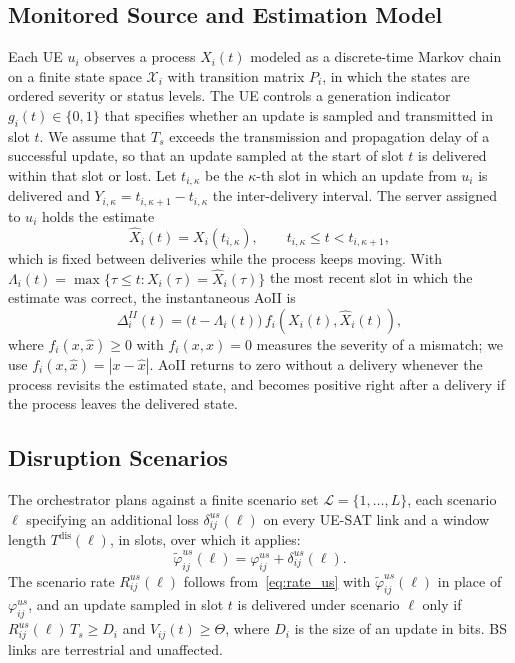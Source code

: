 \subsection{Monitored Source and Estimation Model}

Each UE $u_i$ observes a process $X_i(t)$ modeled as a discrete-time Markov chain on a finite state space
$\mathcal{X}_i$ with transition matrix $P_i$, in which the states are ordered severity or status levels. The UE
controls a generation indicator $g_i(t)\in\{0,1\}$ that specifies whether an update is sampled and transmitted in
slot $t$. We assume that $T_s$ exceeds the transmission and propagation delay of a successful update, so that an update
sampled at the start of slot $t$ is delivered within that slot or lost. Let $t_{i,\kappa}$ be the $\kappa$-th slot in
which an update from $u_i$ is delivered and $Y_{i,\kappa}=t_{i,\kappa+1}-t_{i,\kappa}$ the inter-delivery interval.
The server assigned to $u_i$ holds the estimate
\begin{equation}
    \hat{X}_i(t)=X_i(t_{i,\kappa}),\qquad t_{i,\kappa}\leq t<t_{i,\kappa+1},
\end{equation}
which is fixed between deliveries while the process keeps moving. With $\Lambda_i(t)=\max\{\tau\leq t:
X_i(\tau)=\hat{X}_i(\tau)\}$ the most recent slot in which the estimate was correct, the instantaneous AoII
is~\cite{Maatouk2020}
\begin{equation}
    \Delta_i^{II}(t)=\bigl(t-\Lambda_i(t)\bigr)\,f_i\!\left(X_i(t),\hat{X}_i(t)\right),
    \label{eq:aoii_def}
\end{equation}
where $f_i(x,\hat{x})\geq 0$ with $f_i(x,x)=0$ measures the severity of a mismatch; we use $f_i(x,\hat{x})=|x-\hat{x}|$.
AoII returns to zero without a delivery whenever the process revisits the estimated state, and becomes positive right
after a delivery if the process leaves the delivered state.

\subsection{Disruption Scenarios}

The orchestrator plans against a finite scenario set $\mathscr{L}=\{1,\ldots,L\}$, each scenario $\ell$ specifying an
additional loss $\delta^{us}_{ij}(\ell)$ on every UE-SAT link and a window length $T^{\mathrm{dis}}(\ell)$, in slots,
over which it applies:
\begin{equation}
    \tilde{\varphi}^{us}_{ij}(\ell)=\varphi^{us}_{ij}+\delta^{us}_{ij}(\ell).
    \label{eq:realized_pathloss}
\end{equation}
The scenario rate $R^{us}_{ij}(\ell)$ follows from~\eqref{eq:rate_us} with $\tilde{\varphi}^{us}_{ij}(\ell)$ in place
of $\varphi^{us}_{ij}$, and an update sampled in slot $t$ is delivered under scenario $\ell$ only if
$R^{us}_{ij}(\ell)\,T_s\geq D_i$ and $V_{ij}(t)\geq\Theta$, where $D_i$ is the size of an update in bits. BS links are
terrestrial and unaffected.

